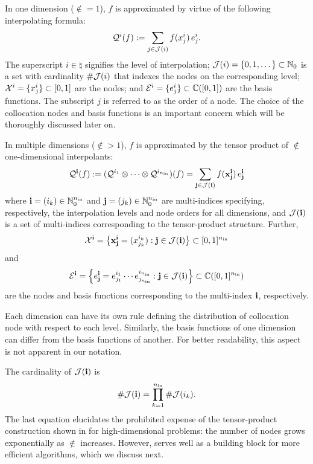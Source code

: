 In one dimension ($\nin = 1$), $f$ is approximated by virtue of the following
interpolating formula:
\begin{equation} \elab{tensor-1d}
  \tensor{i}(f) := \sum_{j \in \index(i)} f(\x^i_j) \, \e^i_j.
\end{equation}
The superscript $i \in \natural$ signifies the level of interpolation;
$\mathcal{J}(i) = \{ 0, 1, \dots \} \subset \mathbb{N}_0$ is a set with cardinality
$\# \mathcal{J}(i)$ that indexes the nodes on the corresponding level;
$\mathcal{X}^i = \{ x^i_j \} \subset [0, 1]$ are the nodes; and $\mathcal{E}^i = \{ e^i_j \}
\subset \mathbb{C}([0, 1])$ are the basis functions. The subscript $j$ is
referred to as the order of a node. The choice of the collocation nodes and
basis functions is an important concern which will be thoroughly discussed later
on.

In multiple dimensions ($\nin > 1$), $f$ is approximated by the tensor product
of $\nin$ one-dimensional interpolants:
\begin{equation} \elab{tensor}
  \tensor{\vi}(f) := (\tensor{i_1} \otimes \cdots \otimes \tensor{i_\nin})(f) =
  \sum_{\vj \in \index(\vi)} f(\v{\x}^\vi_\vj) \, \e^\vi_\vj
\end{equation}
where $\mathbf{i} = (i_k) \in \mathbb{N}_0^{n_\text{in}}$ and $\mathbf{j} = (j_k) \in \mathbb{N}_0^{n_\text{in}}$ are
multi-indices specifying, respectively, the interpolation levels and node orders
for all dimensions, and $\mathcal{J}(\mathbf{i})$ is a set of multi-indices corresponding to
the tensor-product structure. Further,
\[
  \mathcal{X}^{\mathbf{i}} = \left\{ \mathbf{x}^{\mathbf{i}}_{\mathbf{j}} = (x^{i_k}_{j_k}): \mathbf{j} \in \mathcal{J}(\mathbf{i}) \right\} \subset [0, 1]^{n_\text{in}}
\]
and
\[
  \mathcal{E}^{\mathbf{i}} = \left\{ e^{\mathbf{i}}_{\mathbf{j}} = e^{i_1}_{j_1} \cdots e^{i_{n_\text{in}}}_{j_{n_\text{in}}}: \mathbf{j} \in \mathcal{J}(\mathbf{i}) \right\} \subset \mathbb{C}([0, 1]^{n_\text{in}})
\]
are the nodes and basis functions corresponding to the multi-index $\mathbf{i}$,
respectively.
\begin{remark}
Each dimension can have its own rule defining the distribution of collocation
node with respect to each level. Similarly, the basis functions of one dimension
can differ from the basis functions of another. For better readability, this
aspect is not apparent in our notation.
\end{remark}
The cardinality of $\mathcal{J}(\mathbf{i})$ is
\begin{equation} \elab{tensor-cardinality}
  \cardinality{\index(\vi)} = \prod_{k = 1}^\nin \cardinality{\index(i_k)}.
\end{equation}
The last equation elucidates the prohibited expense of the tensor-product
construction shown in  for high-dimensional problems: the number of
nodes grows exponentially as $\nin$ increases. However,  serves
well as a building block for more efficient algorithms, which we discuss next.
